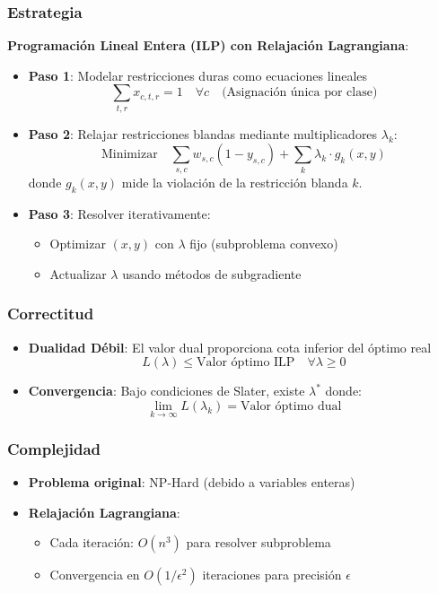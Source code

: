 \documentclass[12pt, a4paper]{article}
\begin{document}
\subsubsection*{Estrategia}
\textbf{Programación Lineal Entera (ILP) con Relajación Lagrangiana}:
\begin{itemize}
    \item \textbf{Paso 1}: Modelar restricciones duras como ecuaciones lineales
    \[
    \sum_{t,r} x_{c,t,r} = 1 \quad \forall c \quad \text{(Asignación única por clase)}
    \]
    
    \item \textbf{Paso 2}: Relajar restricciones blandas mediante multiplicadores $\lambda_k$:
    \[
    \text{Minimizar} \quad \sum_{s,c} w_{s,c}(1 - y_{s,c}) + \sum_{k} \lambda_k \cdot g_k(x,y)
    \]
    donde $g_k(x,y)$ mide la violación de la restricción blanda $k$.
    
    \item \textbf{Paso 3}: Resolver iterativamente:
    \begin{itemize}
        \item Optimizar $(x,y)$ con $\lambda$ fijo (subproblema convexo)
        \item Actualizar $\lambda$ usando métodos de subgradiente
    \end{itemize}
\end{itemize}

\subsubsection*{Correctitud}
\begin{itemize}
    \item \textbf{Dualidad Débil}: El valor dual proporciona cota inferior del óptimo real
    \[
    L(\lambda) \leq \text{Valor óptimo ILP} \quad \forall \lambda \geq 0
    \]
    
    \item \textbf{Convergencia}: Bajo condiciones de Slater, existe $\lambda^*$ donde:
    \[
    \lim_{k \to \infty} L(\lambda_k) = \text{Valor óptimo dual}
    \]
\end{itemize}

\subsubsection*{Complejidad}
\begin{itemize}
    \item \textbf{Problema original}: NP-Hard (debido a variables enteras)
    
    \item \textbf{Relajación Lagrangiana}:
    \begin{itemize}
        \item Cada iteración: $O(n^3)$ para resolver subproblema
        \item Convergencia en $O(1/\epsilon^2)$ iteraciones para precisión $\epsilon$
    \end{itemize}
\end{itemize}
\end{document}
